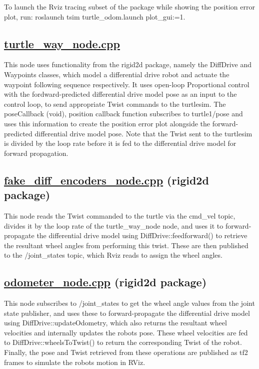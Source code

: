 To launch the Rviz tracing subset of the package while showing the position error plot, run\+: {\ttfamily roslaunch tsim turtle\+\_\+odom.\+launch plot\+\_\+gui\+:=1}.

\subsection*{\hyperlink{turtle__way__node_8cpp}{turtle\+\_\+way\+\_\+node.\+cpp}}

This node uses functionality from the {\ttfamily rigid2d} package, namely the {\ttfamily Diff\+Drive} and {\ttfamily Waypoints} classes, which model a differential drive robot and actuate the waypoint following sequence respectively. It uses open-\/loop Proportional control with the fordward-\/predicted differential drive model pose as an input to the control loop, to send appropriate Twist commands to the turtlesim. The {\ttfamily pose\+Callback (void)}, position callback function subscribes to {\ttfamily turtle1/pose} and uses this information to create the position error plot alongside the forward-\/predicted differential drive model pose. Note that the Twist sent to the turtlesim is divided by the loop rate before it is fed to the differential drive model for forward propagation.

\subsection*{\hyperlink{fake__diff__encoders__node_8cpp}{fake\+\_\+diff\+\_\+encoders\+\_\+node.\+cpp} (rigid2d package)}

This node reads the Twist commanded to the turtle via the {\ttfamily cmd\+\_\+vel} topic, divides it by the loop rate of the {\ttfamily turtle\+\_\+way\+\_\+node} node, and uses it to forward-\/propagate the differential drive model using {\ttfamily Diff\+Drive\+::feedforward()} to retrieve the resultant wheel angles from performing this twist. These are then published to the {\ttfamily /joint\+\_\+states} topic, which Rviz reads to assign the wheel angles.

\subsection*{\hyperlink{odometer__node_8cpp}{odometer\+\_\+node.\+cpp} (rigid2d package)}

This node subscribes to {\ttfamily /joint\+\_\+states} to get the wheel angle values from the joint state publisher, and uses these to forward-\/propagate the differential drive model using {\ttfamily Diff\+Drive\+::update\+Odometry}, which also returns the resultant wheel velocities and internally updates the robot\textquotesingle{}s pose. These wheel velocities are fed to {\ttfamily Diff\+Drive\+::wheels\+To\+Twist()} to return the corresponding Twist of the robot. Finally, the pose and Twist retrieved from these operations are published as {\ttfamily tf2} frames to simulate the robot\textquotesingle{}s motion in R\+Viz.

